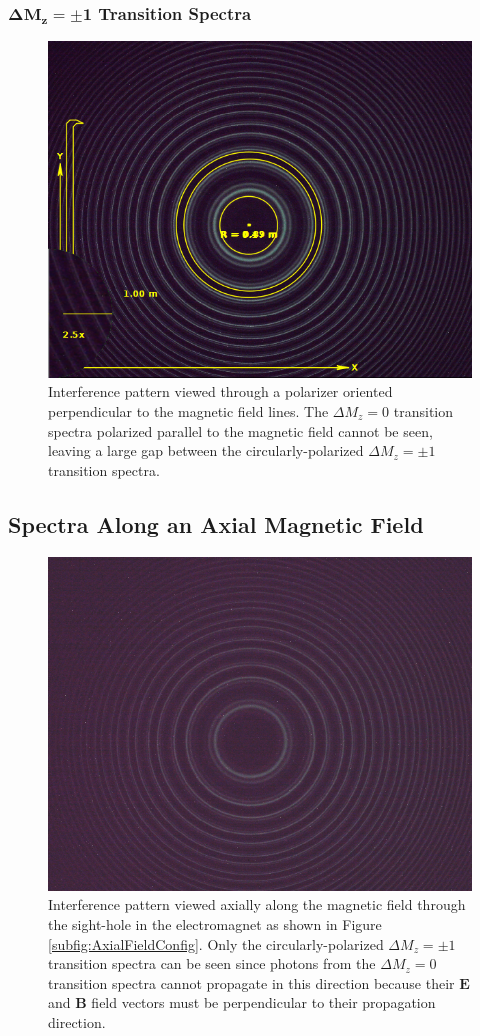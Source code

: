 \documentclass[twocolumn]{article}
\begin{document}
		\subsubsection{$\mathbf{\Delta M_z = \pm1}$ Transition Spectra}
		\begin{figure}
			\centering
			\includegraphics[width=0.55\linewidth]{Images/Run2_PerpendicularPolarizer}
			\caption{Interference pattern viewed through a polarizer oriented perpendicular to the magnetic field lines. The $\Delta M_z = 0$ transition spectra polarized parallel to the magnetic field cannot be seen, leaving a large gap between the circularly-polarized $\Delta M_z = \pm1$ transition spectra.}
			\label{fig:Run2_0Deg}
		\end{figure}

		
	\subsection{Spectra Along an Axial Magnetic Field}
		\begin{figure}
			\centering
			\includegraphics[width=0.55\linewidth]{Images/Run3_AxialField}
			\caption{Interference pattern viewed axially along the magnetic field through the sight-hole in the electromagnet as shown in Figure \ref{subfig:AxialFieldConfig}. Only the circularly-polarized $\Delta M_z = \pm1$ transition spectra can be seen since photons from the $\Delta M_z = 0$ transition spectra cannot propagate in this direction because their $\mathbf{E}$ and $\mathbf{B}$ field vectors must be perpendicular to their propagation direction.}
			\label{fig:Run3_AxialField}
		\end{figure}
\end{document}
